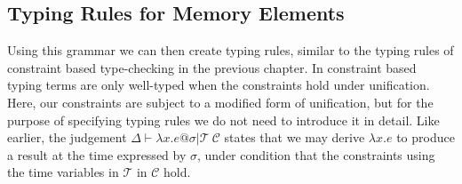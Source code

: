 \subsection{Typing Rules for Memory Elements}
Using this grammar we can then create typing rules, similar to the typing rules of constraint based type-checking in the previous chapter.
In constraint based typing terms are only well-typed when the constraints hold under unification.
Here, our constraints are subject to a modified form of unification, but for the purpose of specifying typing rules  we do not need to introduce it in detail.
Like earlier, the judgement $\Delta \vdash \lambda x.e @ \sigma | \mathcal{T} \: \mathcal{C}$ states that we may derive $\lambda x.e$ to produce a result at the time expressed by $\sigma$, under condition that the constraints using the time variables in $\mathcal{T}$ in $\mathcal{C}$ hold.

